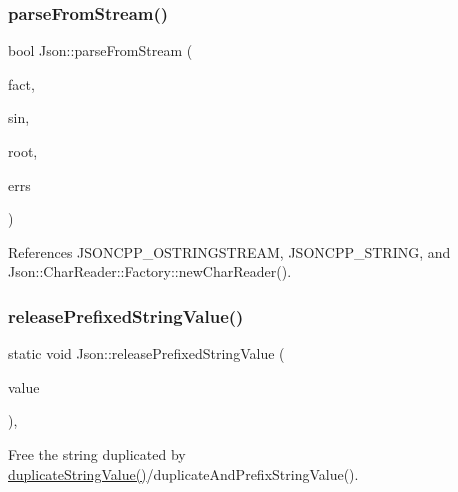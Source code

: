 \subsubsection{\texorpdfstring{parse\+From\+Stream()}{parseFromStream()}\hspace{0.1cm}{\footnotesize\ttfamily [2/2]}}
{\footnotesize\ttfamily bool Json\+::parse\+From\+Stream (\begin{DoxyParamCaption}\item[{\hyperlink{classJson_1_1CharReader_1_1Factory}{Char\+Reader\+::\+Factory} const \&}]{fact,  }\item[{\hyperlink{json_8h_a15f2f70b2ce0a2abd0f8112393dbc4de_a15f2f70b2ce0a2abd0f8112393dbc4de}{J\+S\+O\+N\+C\+P\+P\+\_\+\+I\+S\+T\+R\+E\+AM} \&}]{sin,  }\item[{\hyperlink{classJson_1_1Value}{Value} $\ast$}]{root,  }\item[{\hyperlink{json_8h_a1e723f95759de062585bc4a8fd3fa4be_a1e723f95759de062585bc4a8fd3fa4be}{J\+S\+O\+N\+C\+P\+P\+\_\+\+S\+T\+R\+I\+NG} $\ast$}]{errs }\end{DoxyParamCaption})}



References J\+S\+O\+N\+C\+P\+P\+\_\+\+O\+S\+T\+R\+I\+N\+G\+S\+T\+R\+E\+AM, J\+S\+O\+N\+C\+P\+P\+\_\+\+S\+T\+R\+I\+NG, and Json\+::\+Char\+Reader\+::\+Factory\+::new\+Char\+Reader().

\mbox{\label{namespaceJson_a48f4e3ea655e3b4a5d7f892c81f00511_a48f4e3ea655e3b4a5d7f892c81f00511}} 
\subsubsection{\texorpdfstring{release\+Prefixed\+String\+Value()}{releasePrefixedStringValue()}}
{\footnotesize\ttfamily static void Json\+::release\+Prefixed\+String\+Value (\begin{DoxyParamCaption}\item[{char $\ast$}]{value }\end{DoxyParamCaption})\hspace{0.3cm}{\ttfamily [inline]}, {\ttfamily [static]}}

Free the string duplicated by \hyperlink{namespaceJson_a678ac3a60cd70ec0fb4c9abfd40eb0c4_a678ac3a60cd70ec0fb4c9abfd40eb0c4}{duplicate\+String\+Value()}/duplicate\+And\+Prefix\+String\+Value(). 

